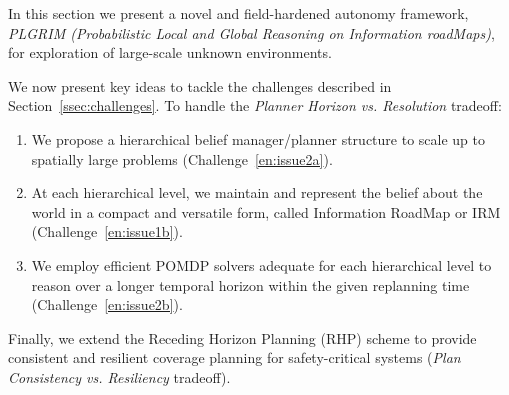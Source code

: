 \documentclass[letterpaper]{article} %
\newcommand{\phdone}[1]{} %
\begin{document}
\phdone{Framework Overview}



In this section we present a novel and field-hardened autonomy framework, \textit{PLGRIM (Probabilistic Local and Global Reasoning on Information roadMaps)}, for exploration of large-scale unknown environments.

We now present key ideas to tackle the challenges described in Section~\ref{ssec:challenges}. To handle the \textit{Planner Horizon vs. Resolution} tradeoff:

\begin{enumerate}[label={\arabic*)}]
  \item We propose a hierarchical belief manager/planner structure to scale up to spatially large problems (Challenge~\ref{en:issue2a}).
  \item At each hierarchical level, we maintain and represent the belief about the world in a compact and versatile form, called Information RoadMap  or IRM (Challenge~\ref{en:issue1b}).
  \item We employ efficient POMDP solvers adequate for each hierarchical level to reason over a longer temporal horizon within the given replanning time (Challenge~\ref{en:issue2b}).
\end{enumerate}

\noindent Finally, we extend the Receding Horizon Planning (RHP) scheme to provide consistent and resilient coverage planning for safety-critical systems (\textit{Plan Consistency vs. Resiliency} tradeoff).

\end{document}
